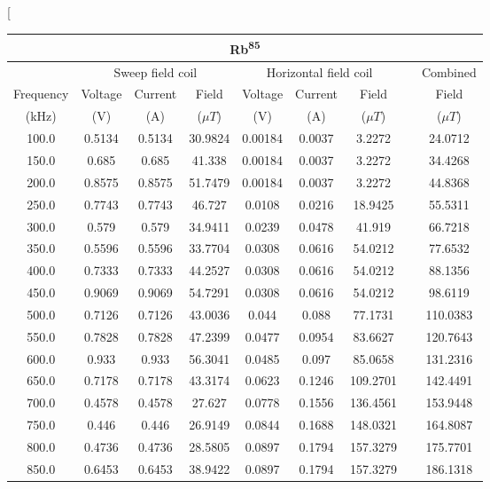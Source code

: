 \documentclass[twocolumn]{article}
\begin{document}
\twocolumn[
\begin{@twocolumnfalse}
\center
\begin{tabular}{|c|c|c|c|c|c|c|c|c|}
\hline
\multicolumn{9}{c}{Rb\textsuperscript{85}} \\ \hline
{} & \multicolumn{3}{c}{Sweep field coil} &
\multicolumn{3}{c}{Horizontal field coil} && Combined \\ \hline
Frequency & Voltage & Current & Field & Voltage & Current & Field && Field \\  
(kHz) & (V) & (A) & ($\mu T$) & (V) & (A) & ($\mu T$) && ($\mu T$) \\ \hline
100.0 & 0.5134 & 0.5134 & 30.9824 & 0.00184 & 0.0037 & 3.2272 && 24.0712 \\ \hline
150.0 & 0.685 & 0.685 & 41.338 & 0.00184 & 0.0037 & 3.2272 && 34.4268 \\ \hline
200.0 & 0.8575 & 0.8575 & 51.7479 & 0.00184 & 0.0037 & 3.2272 && 44.8368 \\ \hline
250.0 & 0.7743 & 0.7743 & 46.727 & 0.0108 & 0.0216 & 18.9425 && 55.5311 \\ \hline
300.0 & 0.579 & 0.579 & 34.9411 & 0.0239 & 0.0478 & 41.919 && 66.7218 \\ \hline
350.0 & 0.5596 & 0.5596 & 33.7704 & 0.0308 & 0.0616 & 54.0212 && 77.6532 \\ \hline
400.0 & 0.7333 & 0.7333 & 44.2527 & 0.0308 & 0.0616 & 54.0212 && 88.1356 \\ \hline
450.0 & 0.9069 & 0.9069 & 54.7291 & 0.0308 & 0.0616 & 54.0212 && 98.6119 \\ \hline
500.0 & 0.7126 & 0.7126 & 43.0036 & 0.044 & 0.088 & 77.1731 && 110.0383 \\ \hline
550.0 & 0.7828 & 0.7828 & 47.2399 & 0.0477 & 0.0954 & 83.6627 && 120.7643 \\ \hline
600.0 & 0.933 & 0.933 & 56.3041 & 0.0485 & 0.097 & 85.0658 && 131.2316 \\ \hline
650.0 & 0.7178 & 0.7178 & 43.3174 & 0.0623 & 0.1246 & 109.2701 && 142.4491 \\ \hline
700.0 & 0.4578 & 0.4578 & 27.627 & 0.0778 & 0.1556 & 136.4561 && 153.9448 \\ \hline
750.0 & 0.446 & 0.446 & 26.9149 & 0.0844 & 0.1688 & 148.0321 && 164.8087 \\ \hline
800.0 & 0.4736 & 0.4736 & 28.5805 & 0.0897 & 0.1794 & 157.3279 && 175.7701 \\ \hline
850.0 & 0.6453 & 0.6453 & 38.9422 & 0.0897 & 0.1794 & 157.3279 && 186.1318 \\ \hline

\end{tabular}
\end{@twocolumnfalse}
\end{document}
